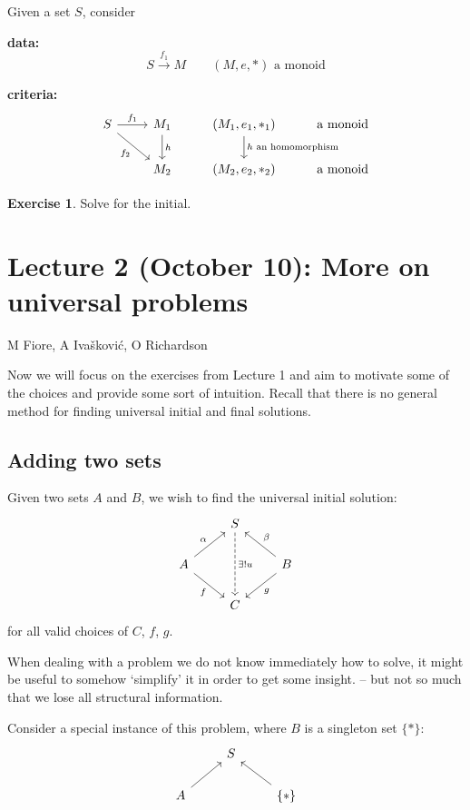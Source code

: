 \documentclass[a4paper, 12pt]{article}
\theoremstyle{definition}
\newtheorem{exercise}{Exercise}
\newcommand{\setof}[1]{ \{ #1 \} }
\begin{document}
Given a set $S$, consider

\textbf{data:}
$$
S \overset{f_1}{\longrightarrow}M \qquad \text{$(M,e,\ast)$ a monoid}
$$

\textbf{criteria:}
$$
\begin{tikzcd}
    S \arrow[r, "f_1"] \arrow[dr, swap, "f_2"] & 
    M_1 
    \arrow[d, "h"] 
    & (M_1,e_1,\ast_1) 
    \arrow[d, "\text{$h$ an homomorphism}"] 
    & \text{a monoid}
    \\
    {}  
    & M_2 & (M_2,e_2,\ast_2) & \text{a monoid}
\end{tikzcd}
$$

\begin{exercise}
    Solve for the initial.
\end{exercise}

\section{Lecture 2 (October 10): More on universal problems}
\vspace*{-5mm}\hspace*{7.75mm}
M Fiore, A Ivašković, O Richardson 
\bigskip

Now we will focus on the exercises from Lecture 1 and aim to motivate some of
the choices and provide some sort of intuition. Recall that there is no general
method for finding universal initial and final solutions.

\subsection{Adding two sets}

Given two sets $A$ and $B$, we wish to find the universal initial solution:
$$
\begin{tikzcd}
    {} & S \arrow[dd, dashed, "\exists! u"] & {} \\
    A \arrow[ru, "\alpha"] \arrow[rd, swap, "f"]
    & {}
    &
    B \arrow[lu, swap, "\beta"] \arrow[ld, "g"]
    \\
    {} & C & {}
\end{tikzcd}
$$
for all valid choices of $C$, $f$, $g$.

When dealing with a problem we do not know immediately how to solve, it might be
useful to somehow `simplify' it in order to get some insight. -- but not so much
that we lose all structural information.

Consider a special instance of this problem, where $B$ is a singleton set
$\setof{\ast}$:
$$
\begin{tikzcd}
    {} & S & {} \\
    A \arrow[ru]
    & {}
    &
    \setof{\ast} \arrow[lu]
\end{tikzcd}
$$
\end{document}

